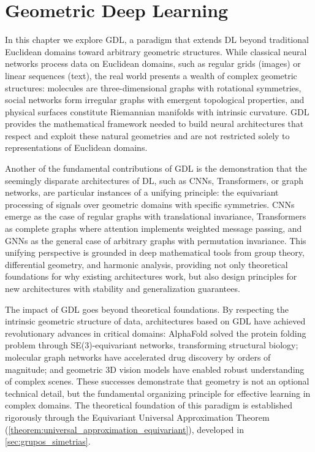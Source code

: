 \chapter{Geometric Deep Learning}\label{ch:gdl}

In this chapter we explore \gls{GDL}, a paradigm that extends \gls{DL} beyond traditional Euclidean domains toward arbitrary geometric structures. While classical neural networks process data on Euclidean domains, such as regular grids (images) or linear sequences (text), the real world presents a wealth of complex geometric structures: molecules are three-dimensional graphs with rotational symmetries, social networks form irregular graphs with emergent topological properties, and physical surfaces constitute Riemannian manifolds with intrinsic curvature. \gls{GDL} provides the mathematical framework needed to build neural architectures that respect and exploit these natural geometries and are not restricted solely to representations of Euclidean domains.

Another of the fundamental contributions of \gls{GDL} is the demonstration that the seemingly disparate architectures of \gls{DL}, such as \glspl{CNN}, \glspl{Transformer}, or graph networks, are particular instances of a unifying principle: the equivariant processing of signals over geometric domains with specific symmetries. \glspl{CNN} emerge as the case of regular graphs with translational invariance, \glspl{Transformer} as complete graphs where attention implements weighted message passing, and \glspl{GNN} as the general case of arbitrary graphs with permutation invariance. This unifying perspective is grounded in deep mathematical tools from group theory, differential geometry, and harmonic analysis, providing not only theoretical foundations for why existing architectures work, but also design principles for new architectures with stability and generalization guarantees.

The impact of \gls{GDL} goes beyond theoretical foundations. By respecting the intrinsic geometric structure of data, architectures based on \gls{GDL} have achieved revolutionary advances in critical domains: AlphaFold solved the protein folding problem through SE(3)-equivariant networks, transforming structural biology; molecular graph networks have accelerated drug discovery by orders of magnitude; and geometric 3D vision models have enabled robust understanding of complex scenes. These successes demonstrate that geometry is not an optional technical detail, but the fundamental organizing principle for effective learning in complex domains. The theoretical foundation of this paradigm is established rigorously through the Equivariant Universal Approximation Theorem (\autoref{theorem:universal_approximation_equivariant}), developed in \autoref{sec:grupos_simetrias}.

